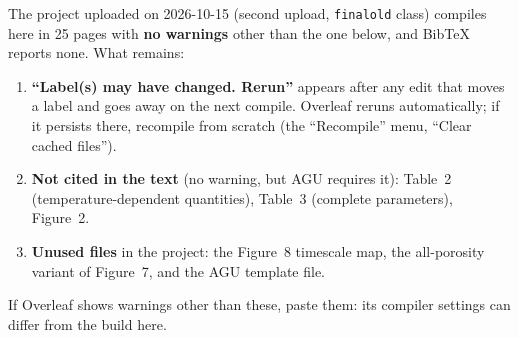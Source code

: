 \documentclass[11pt]{article}
\begin{document}
The project uploaded on 2026-10-15 (second upload, \texttt{finalold} class)
compiles here in 25 pages with \textbf{no warnings} other than the one
below, and BibTeX reports none. What remains:
\begin{enumerate}
\item \textbf{``Label(s) may have changed. Rerun''} appears after any edit
  that moves a label and goes away on the next compile. Overleaf reruns
  automatically; if it persists there, recompile from scratch (the
  ``Recompile'' menu, ``Clear cached files'').
\item \textbf{Not cited in the text} (no warning, but AGU requires it):
  Table~2 (temperature-dependent quantities), Table~3 (complete
  parameters), Figure~2.
\item \textbf{Unused files} in the project: the Figure~8 timescale map,
  the all-porosity variant of Figure~7, and the AGU template file.
\end{enumerate}
If Overleaf shows warnings other than these, paste them: its compiler
settings can differ from the build here.
\end{document}
